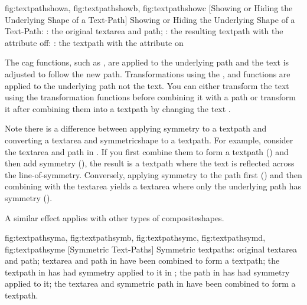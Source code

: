 {
 {fig:textpathshowa}{}{},
 {fig:textpathshowb}{}{},
 {fig:textpathshowc}{}{}
}
[Showing or Hiding the Underlying Shape of a Text-Path]
{Showing or Hiding the Underlying Shape of a Text-Path:
:  the original \gls{textarea} and \gls{path};
: the resulting \gls{textpath} with the
 attribute off:
: the \gls{textpath} with the
 attribute on}

The \gls{cag} functions, such as , are applied to
the underlying path and the text is adjusted to follow the new path.
Transformations using the , 
and  functions are applied to the underlying path
not the text. You can either transform the text using the
transformation functions before combining it with a path or
transform it after combining them into a \gls{textpath} by changing the text
.

Note there is a difference between applying \gls{symmetry} to a
\gls{textpath} and converting a \gls*{textarea} and
\gls{symmetricshape} to a \gls*{textpath}. For example, consider the
\gls{textarea} and \gls{path} in . If
you first combine them to form a \gls*{textpath}
() and then add symmetry
(), the result is a \gls*{textpath}
where the text is reflected across the \gls{line-of-symmetry}.
Conversely, applying \gls{symmetry} to the path first
() and then combining with the
\gls*{textarea} yields a \gls*{textarea} where only the underlying
path has \gls{symmetry} ().

A similar effect applies with other types of \glspl{compositeshape}.

{%
 {fig:textpathsyma}{}{},
 {fig:textpathsymb}{}{},
 {fig:textpathsymc}{}{},
 {fig:textpathsymd}{}{},
 {fig:textpathsyme}{}{}
}
[Symmetric Text-Paths]
{Symmetric \glspl{textpath}:
 original \gls{textarea} and \gls{path};
 \gls{textarea} and \gls{path} in 
 have been combined to
form a \gls{textpath};
 the \gls{textpath} in  
has had \gls{symmetry} applied to it in \editpathmode; 
 the \gls{path} in
 has had \gls{symmetry} applied to it;
 the \gls{textarea} and symmetric path in 
 have been combined to form a
\gls{textpath}.}


